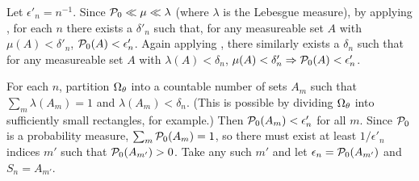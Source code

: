 
\begin{lem}
%
Let $\epsilon'_n = n^{-1}$.  Since $\mathcal{P}_{0} \ll \mu \ll \lambda$ (where $\lambda$
is the Lebesgue measure), by applying \citet[Proposition
15.5]{nielsen:1997:measure}, for each $n$ there exists a $\delta'_n$ such that,
for any measureable set $A$ with $\mu(A) < \delta'_n$, $\mathcal{P}_{0}(A) <
\epsilon'_n$.  Again applying \citet[Proposition 15.5]{nielsen:1997:measure},
there similarly exists a $\delta_n$ such that for any measureable set $A$ with
$\lambda(A) < \delta_n$, $\mu(A) < \delta'_n \Rightarrow \mathcal{P}_{0}(A) <
\epsilon'_n$.

For each $n$, partition $\Omega_{\theta}$ into a countable number of sets $A_{m}$ such
that $\sum_{m} \lambda(A_{m}) = 1$ and $\lambda(A_{m}) < \delta_n$. (This is
possible by dividing $\Omega_{\theta}$ into sufficiently small rectangles, for
example.)  Then $\mathcal{P}_{0}(A_{m}) < \epsilon'_n$ for all $m$.  Since $\mathcal{P}_{0}$ is a
probability measure, $\sum_m \mathcal{P}_{0}(A_{m}) = 1$, so there must exist at least $1 /
\epsilon'_n$ indices $m'$ such that $\mathcal{P}_{0}(A_{m'}) > 0$. Take any such $m'$ and
let $\epsilon_n = \mathcal{P}_{0}(A_{m'})$ and $S_n = A_{m'}$.

%
\end{lem}
